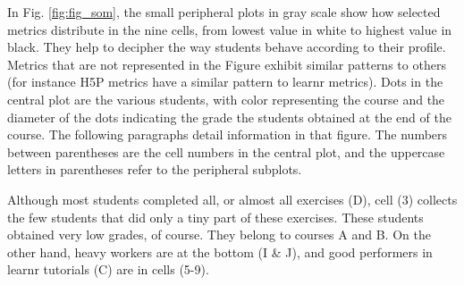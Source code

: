 \documentclass{aims}
\theoremstyle{definition}
\begin{document}
In Fig. \ref {fig:fig_som}, the small peripheral plots in gray scale
show how selected metrics distribute in the nine cells, from lowest
value in white to highest value in black. They help to decipher the way
students behave according to their profile. Metrics that are not
represented in the Figure exhibit similar patterns to others (for
instance H5P metrics have a similar pattern to learnr metrics). Dots in
the central plot are the various students, with color representing the
course and the diameter of the dots indicating the grade the students
obtained at the end of the course. The following paragraphs detail
information in that figure. The numbers between parentheses are the cell
numbers in the central plot, and the uppercase letters in parentheses
refer to the peripheral subplots.

Although most students completed all, or almost all exercises (D), cell
(3) collects the few students that did only a tiny part of these
exercises. These students obtained very low grades, of course. They
belong to courses A and B. On the other hand, heavy workers are at the
bottom (I \& J), and good performers in learnr tutorials (C) are in
cells (5-9).
\end{document}
